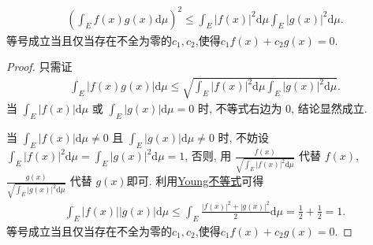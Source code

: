 \documentclass[../../main.tex]{subfiles}
\begin{document}
\begin{theorem}[Cauchy不等式]\label{theorem:Cauchy不等式(一般版本)}
\begin{align*}
\left(\int_E f(x)g(x) \mathrm{d}\mu\right)^2 \leqslant \int_E |f(x)|^2 \mathrm{d}\mu \int_E |g(x)|^2 \mathrm{d}\mu.
\end{align*} 
等号成立当且仅当存在不全为零的$c_1,c_2$,使得$c_1f(x)+c_2g(x)=0.$
\end{theorem}
\begin{proof}
只需证
\begin{align*}
\int_E |f(x)g(x)| \mathrm{d}\mu \leqslant \sqrt{\int_E |f(x)|^2 \mathrm{d}\mu \int_E |g(x)|^2 \mathrm{d}\mu}.
\end{align*}
当 $\int_E |f(x)| \mathrm{d}\mu$ 或 $\int_E |g(x)| \mathrm{d}\mu = 0$ 时, 不等式右边为 $0$, 结论显然成立.

当 $\int_E |f(x)| \mathrm{d}\mu \ne 0$ 且 $\int_E |g(x)| \mathrm{d}\mu \ne 0$ 时, 不妨设 $\int_E |f(x)|^2 \mathrm{d}\mu = \int_E |g(x)|^2 \mathrm{d}\mu = 1$, 否则, 用 $\frac{f(x)}{\sqrt{\int_E |f(x)|^2 \mathrm{d}\mu}}$ 代替 $f(x)$, $\frac{g(x)}{\sqrt{\int_E |g(x)|^2 \mathrm{d}\mu}}$ 代替 $g(x)$即可.
利用\hyperref[theorem:Young不等式初等形式]{Young不等式}可得
\begin{align*}
\int_E |f(x)||g(x)| \mathrm{d}\mu \leqslant \int_E \frac{|f(x)|^2 + |g(x)|^2}{2} \mathrm{d}\mu = \frac{1}{2} + \frac{1}{2} = 1.
\end{align*}
等号成立当且仅当存在不全为零的$c_1,c_2$,使得$c_1f(x)+c_2g(x)=0.$

\end{proof}
\end{document}
